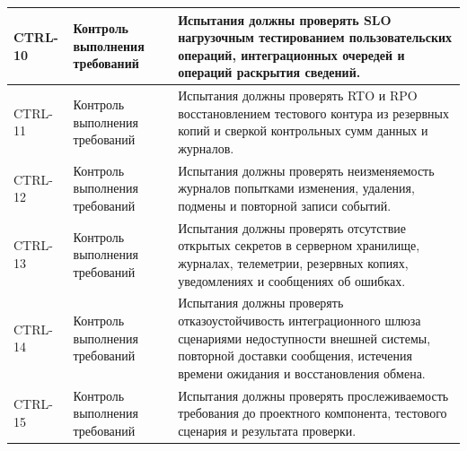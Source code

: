 \begin{longtable}{|P{1.45cm}|P{3.35cm}|P{10.7cm}|}
CTRL-10 & Контроль выполнения требований & Испытания должны проверять SLO нагрузочным тестированием пользовательских операций, интеграционных очередей и операций раскрытия сведений.\\ \hline
CTRL-11 & Контроль выполнения требований & Испытания должны проверять RTO и RPO восстановлением тестового контура из резервных копий и сверкой контрольных сумм данных и журналов.\\ \hline
CTRL-12 & Контроль выполнения требований & Испытания должны проверять неизменяемость журналов попытками изменения, удаления, подмены и повторной записи событий.\\ \hline
CTRL-13 & Контроль выполнения требований & Испытания должны проверять отсутствие открытых секретов в серверном хранилище, журналах, телеметрии, резервных копиях, уведомлениях и сообщениях об ошибках.\\ \hline
CTRL-14 & Контроль выполнения требований & Испытания должны проверять отказоустойчивость интеграционного шлюза сценариями недоступности внешней системы, повторной доставки сообщения, истечения времени ожидания и восстановления обмена.\\ \hline
CTRL-15 & Контроль выполнения требований & Испытания должны проверять прослеживаемость требования до проектного компонента, тестового сценария и результата проверки.\\ \hline
\end{longtable}

\normalsize
\onehalfspacing
